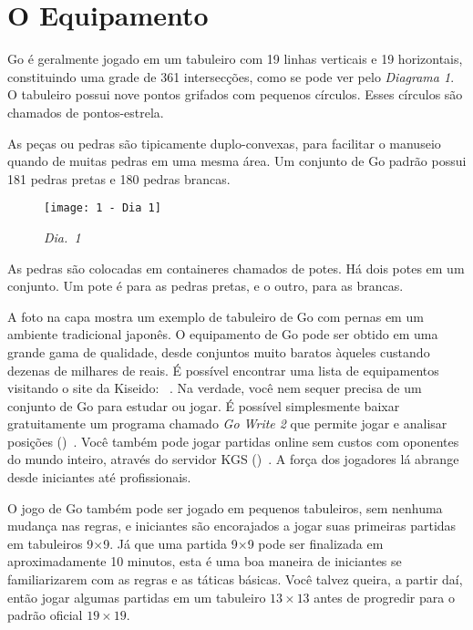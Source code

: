 \chapter{O Equipamento}

Go é geralmente jogado em um tabuleiro com 19 linhas verticais e 19 horizontais, constituindo uma grade de 361 intersecções, como se pode ver pelo \emph{Diagrama 1}. O tabuleiro possui nove pontos grifados com pequenos círculos. Esses círculos são chamados de pontos-estrela.

As peças ou pedras são tipicamente duplo-convexas, para facilitar o manuseio quando de muitas pedras em uma mesma área. Um conjunto de Go padrão possui 181 pedras pretas e 180 pedras brancas.

\begin{wrapfigure}{r}{60mm}
    \vspace{-20pt}
    \begin{center}
        \texttt{[image: 1 - Dia 1]}
        \captionsetup{justification=centering}
        \caption*{\emph{Dia.\@~1}}
    \end{center}
    \vspace{-25pt}
\end{wrapfigure}

As pedras são colocadas em containeres chamados de potes. Há dois potes em um conjunto. Um pote é para as pedras pretas, e o outro, para as brancas.

A foto na capa mostra um exemplo de tabuleiro de Go com pernas em um ambiente tradicional japonês. O equipamento de Go pode ser obtido em uma grande gama de qualidade, desde conjuntos muito baratos àqueles custando dezenas de milhares de reais. É possível encontrar uma lista de equipamentos visitando o site da Kiseido: \href{https://www.kiseido.com}{}~\cite{kiseido}. Na verdade, você nem sequer precisa de um conjunto de Go para estudar ou jogar. É possível simplesmente baixar gratuitamente um programa chamado \emph{Go Write 2} que permite jogar e analisar posições (\href{https://www.gowrite.net/GOWrite2_download.html}{})~\cite{gowrite}. Você também pode jogar partidas online sem custos com oponentes do mundo inteiro, através do servidor KGS (\href{https://www.gokgs.com}{})~\cite{kgs}. A força dos jogadores lá abrange desde iniciantes até profissionais.

O jogo de Go também pode ser jogado em pequenos tabuleiros, sem nenhuma mudança nas regras, e iniciantes são encorajados a jogar suas primeiras partidas em tabuleiros 9\(\times\)9. Já que uma partida 9\(\times\)9 pode ser finalizada em aproximadamente 10 minutos, esta é uma boa maneira de iniciantes se familiarizarem com as regras e as táticas básicas. Você talvez queira, a partir daí, então jogar algumas partidas em um tabuleiro $13\times13$ antes de progredir para o padrão oficial $19\times19$.